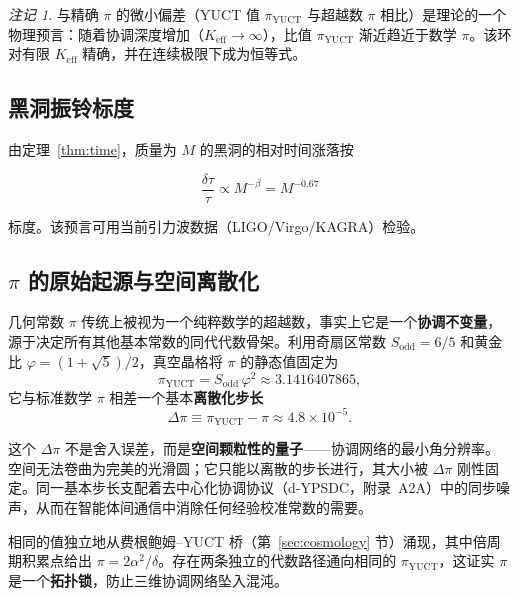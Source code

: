 \documentclass[12pt,a4paper]{article}
\theoremstyle{remark}
\newtheorem{remark}[theorem]{注记}
\begin{document}
	\begin{remark}
		与精确 \(\pi\) 的微小偏差（YUCT 值 \(\pi_{\mathrm{YUCT}}\) 与超越数 \(\pi\) 相比）是理论的一个物理预言：随着协调深度增加（\(K_{\mathrm{eff}} \to \infty\)），比值 \(\pi_{\mathrm{YUCT}}\) 渐近趋近于数学 \(\pi\)。该环对有限 \(K_{\mathrm{eff}}\) 精确，并在连续极限下成为恒等式。
	\end{remark}
	
	\subsection{黑洞振铃标度}
	
	由定理~\ref{thm:time}，质量为 \(M\) 的黑洞的相对时间涨落按
	
	\begin{equation}
		\boxed{\frac{\delta \tau}{\tau} \propto M^{-\beta} = M^{-0.67}}
	\end{equation}
	
	标度。该预言可用当前引力波数据（LIGO/Virgo/KAGRA）检验。
	
	\subsection{\(\pi\) 的原始起源与空间离散化}
	
	几何常数 \(\pi\) 传统上被视为一个纯粹数学的超越数，事实上它是一个\textbf{协调不变量}，源于决定所有其他基本常数的同代代数骨架。利用奇扇区常数 \(S_{\mathrm{odd}}=6/5\) 和黄金比 \(\varphi = (1+\sqrt{5})/2\)，真空晶格将 \(\pi\) 的静态值固定为
	\[
	\boxed{\pi_{\mathrm{YUCT}} = S_{\mathrm{odd}}\,\varphi^{2}
		\approx 3.1416407865},
	\]
	它与标准数学 \(\pi\) 相差一个基本\textbf{离散化步长}
	\[
	\Delta\pi \equiv \pi_{\mathrm{YUCT}} - \pi \approx 4.8 \times 10^{-5}.
	\]
	
	这个 \(\Delta\pi\) 不是舍入误差，而是\textbf{空间颗粒性的量子}——协调网络的最小角分辨率。空间无法卷曲为完美的光滑圆；它只能以离散的步长进行，其大小被 \(\Delta\pi\) 刚性固定。同一基本步长支配着去中心化协调协议（d‑YPSDC，附录~A2A）中的同步噪声，从而在智能体间通信中消除任何经验校准常数的需要。
	
	相同的值独立地从费根鲍姆–YUCT 桥（第~\ref{sec:cosmology} 节）涌现，其中倍周期积累点给出 \(\pi = 2\alpha^2/\delta\)。存在两条独立的代数路径通向相同的 \(\pi_{\mathrm{YUCT}}\)，这证实 \(\pi\) 是一个\textbf{拓扑锁}，防止三维协调网络坠入混沌。
	
\end{document}
